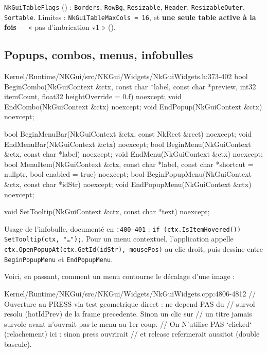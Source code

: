 \texttt{NkGuiTableFlags} () : \texttt{Borders},
\texttt{RowBg}, \texttt{Resizable}, \texttt{Header}, \texttt{ResizableOuter},
\texttt{Sortable}. Limites : \texttt{NkGuiTableMaxCols = 16}, et \textbf{une
seule table active à la fois} — « pas d'imbrication v1 »
().

\subsection{Popups, combos, menus, infobulles}

\begin{nkcode}{Kernel/Runtime/NKGui/src/NKGui/Widgets/NkGuiWidgets.h:373-402}
bool BeginCombo(NkGuiContext &ctx, const char *label, const char *preview, int32 itemCount,
                float32 heightOverride = 0.f) noexcept;
void EndCombo(NkGuiContext &ctx) noexcept;
void EndPopup(NkGuiContext &ctx) noexcept;

bool BeginMenuBar(NkGuiContext &ctx, const NkRect &rect) noexcept;
void EndMenuBar(NkGuiContext &ctx) noexcept;
bool BeginMenu(NkGuiContext &ctx, const char *label) noexcept;
void EndMenu(NkGuiContext &ctx) noexcept;
bool MenuItem(NkGuiContext &ctx, const char *label, const char *shortcut = nullptr,
              bool enabled = true) noexcept;
bool BeginPopupMenu(NkGuiContext &ctx, const char *idStr) noexcept;
void EndPopupMenu(NkGuiContext &ctx) noexcept;

void SetTooltip(NkGuiContext &ctx, const char *text) noexcept;
\end{nkcode}

Usage de l'infobulle, documenté en \texttt{:400-401} :
\texttt{if (ctx.IsItemHovered()) SetTooltip(ctx, "…");}. Pour un menu
contextuel, l'application appelle
\texttt{ctx.OpenPopupAt(ctx.GetId(idStr), mousePos)} au clic droit, puis dessine
entre \texttt{BeginPopupMenu} et \texttt{EndPopupMenu}.

Voici, en passant, comment un menu contourne le décalage d'une image :

\begin{nkcode}{Kernel/Runtime/NKGui/src/NKGui/Widgets/NkGuiWidgets.cpp:4806-4812}
// Ouverture au PRESS via test geometrique direct : ne depend PAS du
// survol resolu (hotIdPrev) de la frame precedente. Sinon un clic sur
// un titre jamais survole avant n'ouvrait pas le menu au 1er coup.
// On N'utilise PAS `clicked` (relachement) ici : sinon press ouvrirait
// et release refermerait aussitot (double bascule).
\end{nkcode}


